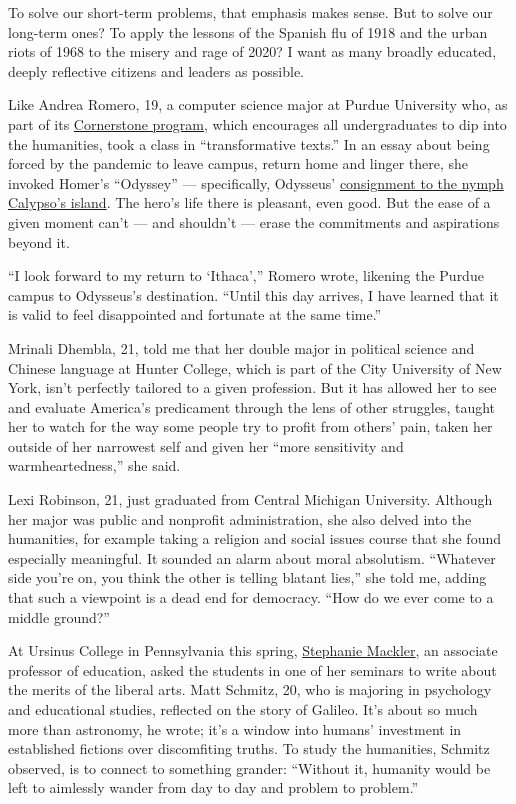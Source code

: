 To solve our short-term problems, that emphasis makes sense. But to
solve our long-term ones? To apply the lessons of the Spanish flu of
1918 and the urban riots of 1968 to the misery and rage of 2020? I want
as many broadly educated, deeply reflective citizens and leaders as
possible.

Like Andrea Romero, 19, a computer science major at Purdue University
who, as part of its
\href{https://cla.purdue.edu/academic/cornerstone/index.html}{Cornerstone
program}, which encourages all undergraduates to dip into the
humanities, took a class in ``transformative texts.'' In an essay about
being forced by the pandemic to leave campus, return home and linger
there, she invoked Homer's ``Odyssey'' --- specifically, Odysseus'
\href{https://www.greekmyths-greekmythology.com/calypso-odysseus-greek-myth/}{consignment
to the nymph Calypso's island}. The hero's life there is pleasant, even
good. But the ease of a given moment can't --- and shouldn't --- erase
the commitments and aspirations beyond it.

``I look forward to my return to `Ithaca','' Romero wrote, likening the
Purdue campus to Odysseus's destination. ``Until this day arrives, I
have learned that it is valid to feel disappointed and fortunate at the
same time.''

Mrinali Dhembla, 21, told me that her double major in political science
and Chinese language at Hunter College, which is part of the City
University of New York, isn't perfectly tailored to a given profession.
But it has allowed her to see and evaluate America's predicament through
the lens of other struggles, taught her to watch for the way some people
try to profit from others' pain, taken her outside of her narrowest self
and given her ``more sensitivity and warmheartedness,'' she said.

Lexi Robinson, 21, just graduated from Central Michigan University.
Although her major was public and nonprofit administration, she also
delved into the humanities, for example taking a religion and social
issues course that she found especially meaningful. It sounded an alarm
about moral absolutism. ``Whatever side you're on, you think the other
is telling blatant lies,'' she told me, adding that such a viewpoint is
a dead end for democracy. ``How do we ever come to a middle ground?''

At Ursinus College in Pennsylvania this spring,
\href{https://www.ursinus.edu/live/profiles/83-stephanie-mackler}{Stephanie
Mackler}, an associate professor of education, asked the students in one
of her seminars to write about the merits of the liberal arts. Matt
Schmitz, 20, who is majoring in psychology and educational studies,
reflected on the story of Galileo. It's about so much more than
astronomy, he wrote; it's a window into humans' investment in
established fictions over discomfiting truths. To study the humanities,
Schmitz observed, is to connect to something grander: ``Without it,
humanity would be left to aimlessly wander from day to day and problem
to problem.''

